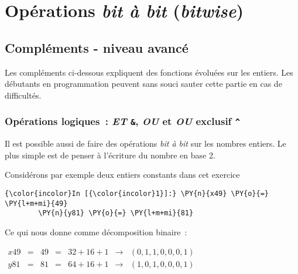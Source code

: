     
    
    
    

    

    \hypertarget{opuxe9rations-bit-uxe0-bit-bitwise}{%
\section{\texorpdfstring{Opérations \emph{bit à bit}
(\emph{bitwise})}{Opérations bit à bit (bitwise)}}\label{opuxe9rations-bit-uxe0-bit-bitwise}}

    \hypertarget{compluxe9ments---niveau-avancuxe9}{%
\subsection{Compléments - niveau
avancé}\label{compluxe9ments---niveau-avancuxe9}}

    Les compléments ci-dessous expliquent des fonctions évoluées sur les
entiers. Les débutants en programmation peuvent sans souci sauter cette
partie en cas de difficultés.

    \hypertarget{opuxe9rations-logiques-et-ou-et-ou-exclusif}{%
\subsubsection{\texorpdfstring{Opérations logiques~: \emph{ET}
\texttt{\&}, \emph{OU} \texttt{\textbar{}} et \emph{OU} exclusif
\texttt{\^{}}}{Opérations logiques~: ET \&, OU \textbar{} et OU exclusif \^{}}}\label{opuxe9rations-logiques-et-ou-et-ou-exclusif}}

    Il est possible aussi de faire des opérations \emph{bit à bit} sur les
nombres entiers. Le plus simple est de penser à l'écriture du nombre en
base 2.

Considérons par exemple deux entiers constants dans cet exercice

    \begin{Verbatim}[commandchars=\\\{\},frame=single,framerule=0.3mm,rulecolor=\color{cellframecolor}]
{\color{incolor}In [{\color{incolor}1}]:} \PY{n}{x49} \PY{o}{=} \PY{l+m+mi}{49}
        \PY{n}{y81} \PY{o}{=} \PY{l+m+mi}{81}
\end{Verbatim}


    Ce qui nous donne comme décomposition binaire~:

\(\begin{array}{rcccccc} x49 & = & 49 & = & 32 + 16 + 1 & \rightarrow &(0,1,1,0,0,0,1) \\ y81 & = & 81 & = & 64 + 16 + 1 & \rightarrow &(1,0,1,0,0,0,1) \end{array}\)

